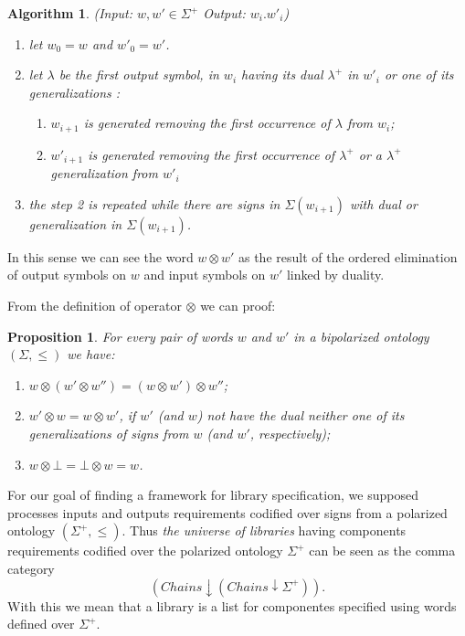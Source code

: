 \documentclass[oribibl]{llncs}
\newtheorem{prop}{Proposition}
\newtheorem{alg}{Algorithm}
\begin{document}
\begin{alg}\label{op:StringGluing}
    (Input: $w,w'\in \Sigma^+$ Output: $w_i.w'_i$)
    \begin{enumerate}

    \item let $w_0=w$ and $w'_0=w'$.
    \item let $\lambda$ be the first output symbol, in $w_i$ having its dual  $\lambda^+$ in
    $w'_i$ or one of its generalizations :
            \begin{enumerate}
            \item $w_{i+1}$ is generated removing the first occurrence of $\lambda$ from
    $w_i$;
            \item $w'_{i+1}$ is generated removing the first occurrence of $\lambda^+$ or a $\lambda^+$ generalization
    from $w'_i$
            \end{enumerate}
    \item the step 2 is repeated while there are signs in $\Sigma(w_{i+1})$ with dual or generalization in $\Sigma(w_{i+1})$.
    \end{enumerate}
\end{alg}

In this sense we can see the word $w\otimes w'$ as the result of the ordered elimination of output symbols on $w$ and input symbols on $w'$ linked by duality.

From the definition of operator $\otimes$ we can proof:
\begin{prop}
For every pair of words $w$ and $w'$ in a bipolarized ontology
$(\Sigma,\leq)$ we have:
    \begin{enumerate}
    \item $w\otimes  (w'\otimes  w'') = (w\otimes   w')\otimes  w''$;
    \item $w'\otimes w = w\otimes  w'$, if $w'$ (and $w$) not have the dual neither one of its generalizations of signs from $w$ (and $w'$, respectively);
    \item $w\otimes \bot=\bot \otimes w  = w$.
    \end{enumerate}
\end{prop}

For our goal of finding a framework for library specification,
we supposed processes inputs and outputs requirements codified over
signs from a polarized ontology $(\Sigma^+,\leq)$. Thus \emph{the
universe of libraries} having components requirements codified over
the polarized ontology $\Sigma^+$ can be seen as the comma category
\[(Chains \downarrow(Chains \downarrow \Sigma^+)).\]
With this we mean that a library is a list for componentes specified using words defined over $\Sigma^+$.
\end{document}
